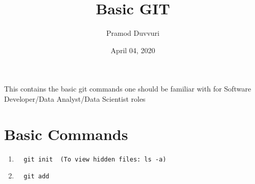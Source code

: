 \documentclass[11pt]{article}
\title{Basic GIT}
\author{Pramod Duvvuri}
\date{April 04, 2020}
\begin{document}
	\maketitle
	This contains the basic git commands one should be familiar with for Software Developer/Data Analyst/Data Scientist roles 
   \section*{Basic Commands}
   \begin{enumerate}
   	\item \begin{verbatim}  git init  (To view hidden files: ls -a)\end{verbatim}
    \item \begin{verbatim}  git add \end{verbatim}  	
   \end{enumerate}
\end{document}

